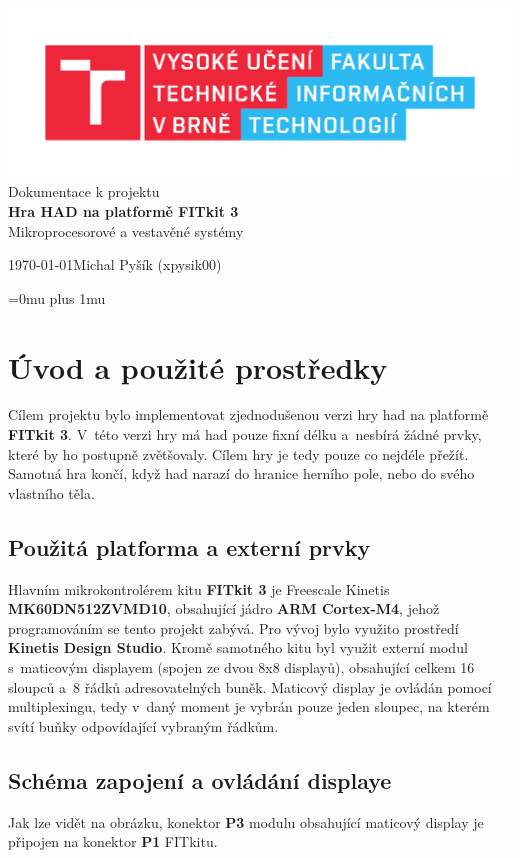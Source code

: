 \documentclass[a4paper, 11pt]{article}
\begin{document}
\begin{titlepage}
\begin{center}
    \includegraphics[width=0.77\linewidth]{FIT_logo.pdf} \\
    \Huge Dokumentace k projektu\\
    \huge{\textbf{Hra HAD na platformě FITkit 3}}\\
    \Large Mikroprocesorové a vestavěné systémy
\end{center}
\Large{\today \hfill Michal Pyšík (xpysik00)}
\end{titlepage}
\Urlmuskip=0mu plus 1mu

\section{Úvod a použité prostředky}
Cílem projektu bylo implementovat zjednodušenou verzi hry had na platformě \textbf{FITkit 3}.
V~této verzi hry má had pouze fixní délku a~nesbírá žádné prvky, které by ho postupně zvětšovaly.
Cílem hry je tedy pouze co nejdéle přežít. Samotná hra končí, když had narazí do hranice herního pole,
nebo do svého vlastního těla.

\subsection{Použitá platforma a externí prvky}
Hlavním mikrokontrolérem kitu  \textbf{FITkit 3} je Freescale Kinetis \textbf{MK60DN512ZVMD10},
obsahující jádro \textbf{ARM Cortex-M4}, jehož programováním se tento projekt zabývá.
Pro vývoj bylo využito prostředí \textbf{Kinetis Design Studio}. Kromě samotného kitu
byl využit externí modul s~maticovým displayem (spojen ze dvou 8x8 displayů), obsahující celkem  16 sloupců a~8 řádků
adresovatelných buněk. Maticový display je ovládán pomocí multiplexingu, tedy v~daný moment je vybrán pouze jeden sloupec,
na kterém svítí buňky odpovídající vybraným řádkům.

\subsection{Schéma zapojení a ovládání displaye}
Jak lze vidět na obrázku, konektor \textbf{P3} modulu obsahující maticový display je připojen na konektor \textbf{P1}
FITkitu.
\end{document}
